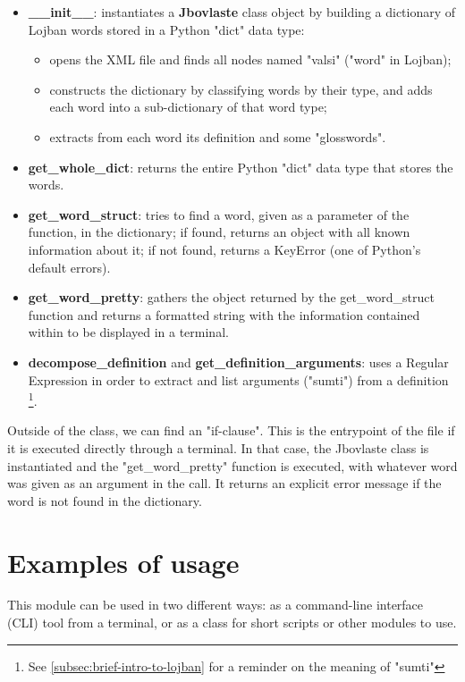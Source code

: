 \begin{itemize}
\item \textbf{\_\_init\_\_}: instantiates a \textbf{Jbovlaste} class object by building a dictionary of
Lojban words stored in a Python "dict" data type:
  \begin{itemize}
    \item opens the XML file and finds all nodes named "valsi" ("word" in Lojban);
    \item constructs the dictionary by classifying words by their type, and adds
    each word into a sub-dictionary of that word type;
    \item extracts from each word its definition and some "glosswords".
  \end{itemize}
\item \textbf{get\_whole\_dict}: returns the entire Python "dict" data type that stores
the words.
\item \textbf{get\_word\_struct}: tries to find a word, given as a parameter of the function,
in the dictionary; if found, returns an object with all known information about it;
if not found, returns a KeyError (one of Python's default errors).
\item \textbf{get\_word\_pretty}: gathers the object returned by the get\_word\_struct function and returns
a formatted string with the information contained within to be displayed in a terminal.
\item \textbf{decompose\_definition} and \textbf{get\_definition\_arguments}: uses a Regular Expression
in order to extract and list arguments ("sumti") from a definition
\footnote{See \ref{subsec:brief-intro-to-lojban} for a reminder on the meaning of "sumti"}.
\end{itemize}

Outside of the class, we can find an "if-clause".
This is the entrypoint of the file if it is executed directly through a terminal.
In that case, the Jbovlaste class is instantiated and the "get\_word\_pretty" function
is executed, with whatever word was given as an argument in the call. It returns an explicit
error message if the word is not found in the dictionary.

\newpage

\section{Examples of usage}

This module can be used in two different ways: as a command-line interface (CLI) tool
from a terminal, or as a class for short scripts or other modules to use.

